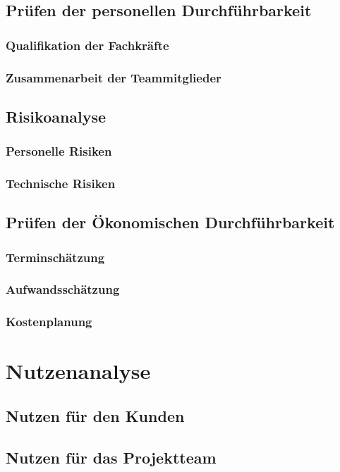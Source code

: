 \documentclass[a4paper,12pt]{scrreprt}
\begin{document}
	\section{Pr\"ufen der personellen Durchf\"uhrbarkeit}
		
		\subsection{Qualifikation der Fachkr\"afte}
			
		\subsection{Zusammenarbeit der Teammitglieder}
			
	\section{Risikoanalyse}
		
		\subsection{Personelle Risiken}
			
		\subsection{Technische Risiken}
			
	\section{Pr\"ufen der \"Okonomischen Durchf\"uhrbarkeit}
		
		\subsection{Terminsch\"atzung}
			
			
			
			
		\subsection{Aufwandssch\"atzung}
			
		\subsection{Kostenplanung}
			
\chapter{Nutzenanalyse}
	
	\section{Nutzen f\"ur den Kunden}
	
	\section{Nutzen f\"ur das Projektteam}
	
\end{document}
